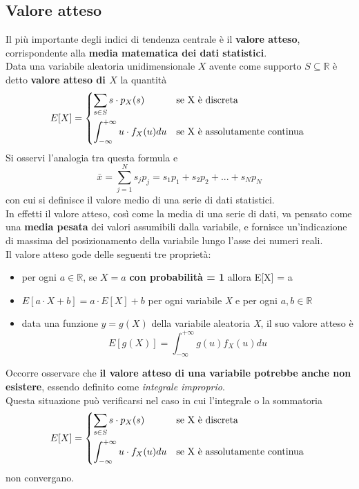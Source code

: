 \subsection{Valore atteso}
Il più importante degli indici di tendenza centrale è il \textbf{valore atteso}, corrispondente alla \textbf{media matematica dei dati statistici}.\\
Data una variabile aleatoria unidimensionale $X$ avente come supporto $S \subseteq \mathbb{R}$ è detto \textbf{valore atteso di $X$} la quantità
\begin{equation}
E[X] = 
	\begin{dcases*}
			\sum_{s \in S} s \cdot p_X(s) & \text{se X è discreta} \\
			\int_{-\infty}^{+\infty} u \cdot f_X(u) du & \text{se X è assolutamente continua}
	\end{dcases*}
\end{equation}
Si osservi l'analogia tra questa formula e 
\begin{equation*}
\bar{x} = \sum_{j=1}^N s_j p_j  = s_1 p_1 + s_2 p_2 + ... + s_N p_N
\end{equation*}
con cui si definisce il valore medio di una serie di dati statistici. \\
In effetti il valore atteso, così come la media di una serie di dati, va pensato come una \textbf{media pesata}  dei valori assumibili dalla variabile, e fornisce un’indicazione di massima del posizionamento della variabile lungo l’asse dei numeri reali. \\
Il valore atteso gode delle seguenti tre proprietà:
\begin{itemize}
	\item per ogni $a \in \mathbb{R}$, se $X = a$ \textbf{con probabilità = 1} allora E[X] = a
	\item $E[a \cdot X + b] = a \cdot E[X] + b$ per ogni variabile \textit{X} e per ogni $a, b \in \mathbb{R}$
	\item data una funzione $y = g(X)$ della variabile aleatoria \textit{X}, il suo valore atteso è 
			\[
			E[g(X)] = \int_{-\infty}^{+\infty} g(u) f_X(u) du
			\]
\end{itemize}
Occorre osservare che \textbf{il valore atteso di una variabile potrebbe anche non esistere}, essendo definito come \textit{integrale improprio}.\\
Questa situazione può verificarsi nel caso in cui l'integrale o la sommatoria
\begin{equation}
E[X] = 
\begin{dcases*}
\sum_{s \in S} s \cdot p_X(s) & \text{se X è discreta} \\
\int_{-\infty}^{+\infty} u \cdot f_X(u) du & \text{se X è assolutamente continua}
\end{dcases*}
\end{equation}
non convergano.

